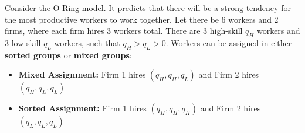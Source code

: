 \documentclass[12pt]{exam}
\begin{document}
\begin{questions}
\newpage 

\question 
Consider the O-Ring model.
It predicts that there will be a strong tendency for the most productive workers to work together. 
Let there be 6 workers and 2 firms, where each firm hires 3 workers total.
There are 3 high-skill $q_{H}$ workers and 3 low-skill $q_{L}$ workers, such that $q_{H} > q_{L} > 0$.
Workers can be assigned in either \textbf{sorted groups} or \textbf{mixed groups}:
\begin{itemize}
  \item \textbf{Mixed Assignment:} Firm 1 hires $(q_{H},q_{H},q_{L})$ and Firm 2 hires $(q_{H},q_{L},q_{L})$
  \item \textbf{Sorted Assignment:} Firm 1 hires $(q_{H},q_{H},q_{H})$ and Firm 2 hires $(q_{L},q_{L},q_{L})$
\end{itemize}


\end{questions}
\end{document}
